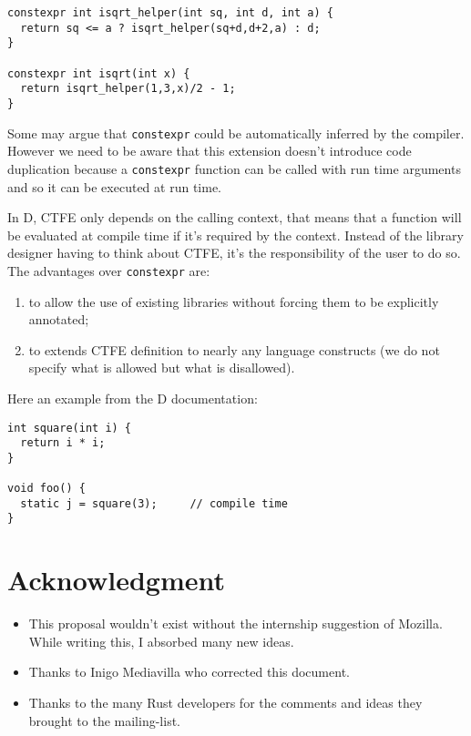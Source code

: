 \documentclass[a4paper,11pt]{article}
\begin{document}
\begin{lstlisting}
constexpr int isqrt_helper(int sq, int d, int a) {
  return sq <= a ? isqrt_helper(sq+d,d+2,a) : d;
}

constexpr int isqrt(int x) {
  return isqrt_helper(1,3,x)/2 - 1;
}
\end{lstlisting}

Some may argue that \lstinline{constexpr} could be automatically inferred by the compiler. However we need to be aware that this extension doesn't introduce code duplication because a \lstinline{constexpr} function can be called with run time arguments and so it can be executed at run time.
\newline

In D, CTFE only depends on the calling context, that means that a function will be evaluated at compile time if it's required by the context. Instead of the library designer having to think about CTFE, it's the responsibility of the user to do so. The advantages over \lstinline{constexpr} are:

\begin{enumerate}
\item to allow the use of existing libraries without forcing them to be explicitly annotated;
\item to extends CTFE definition to nearly any language constructs (we do not specify what is allowed but what is disallowed).
\end{enumerate}

Here an example from the D documentation\cite{D_CTFE}:

\begin{lstlisting}
int square(int i) {
  return i * i;
}

void foo() {
  static j = square(3);     // compile time
}
\end{lstlisting}

\section{Acknowledgment}

\begin{itemize}
\item This proposal wouldn't exist without the internship suggestion of Mozilla.  While writing this, I absorbed many new ideas.
\item Thanks to Inigo Mediavilla who corrected this document.
\item Thanks to the many Rust developers for the comments and ideas they brought to the mailing-list.
\end{itemize}
\end{document}

